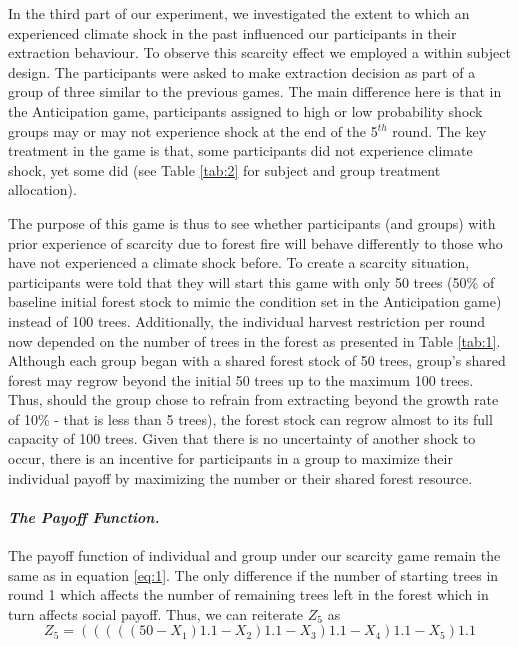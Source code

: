 In the third part of our experiment, we investigated the extent to which an experienced climate shock in the past influenced our participants in their extraction behaviour. To observe this scarcity effect we employed a within subject design. The participants were asked to make extraction decision as part of a group of three similar to the previous games. The main difference here is that in the Anticipation game, participants assigned to high or low probability shock groups may or may not experience shock at the end of the 5$^{th}$ round. The key treatment in the game is that, some participants did not experience climate shock, yet some did (see Table \ref{tab:2} for subject and group treatment allocation).

\noindent The purpose of this game is thus to see whether participants (and groups) with prior experience of scarcity due to forest fire will behave differently to those who have not experienced a climate shock before. To create a scarcity situation, participants were told that they will start this game with only 50 trees (50\% of baseline initial forest stock to mimic the condition set in the Anticipation game) instead of 100 trees. Additionally, the individual harvest restriction per round now depended on the number of trees in the forest as presented in Table \ref{tab:1}. Although each group began with a shared forest stock of 50 trees, group's shared forest may regrow beyond the initial 50 trees up to the maximum 100 trees. Thus, should the group chose to refrain from extracting beyond the growth rate of 10\% - that is less than 5 trees), the forest stock can regrow almost to its full capacity of 100 trees. Given that there is no uncertainty of another shock to occur, there is an incentive for participants in a group to maximize their individual payoff by maximizing the number or their shared forest resource.



\paragraph{\textit{The Payoff Function.}} The payoff function of individual and group under our scarcity game remain the same as in equation \eqref{eq:1}. The only difference if the number of starting trees in round 1 which affects the number of remaining trees left in the forest which in turn affects social payoff. Thus, we can reiterate $Z_{5}$ as
\begin{equation}
\label{eq:8}
    Z_{5} = \left( \left( \left( \left( \left(50 - X_{1}\right) 1.1 - X_{2}\right) 1.1 - X_{3} \right) 1.1 - X_{4} \right) 1.1 - X_{5} \right) 1.1
\end{equation}

